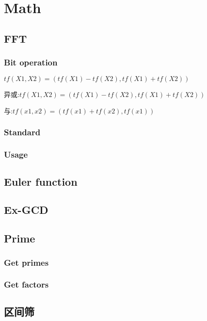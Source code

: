 \section{Math}
\subsection{FFT}
\subsubsection{Bit operation}
$tf(X1,X2) = (tf(X1) - tf(X2), tf(X1) + tf(X2))$

异或:$tf(X1,X2) = (tf(X1) - tf(X2), tf(X1) + tf(X2))$ 

与:$tf(x1,x2)=(tf(x1) + tf(x2), tf(x1))$

\subsubsection{Standard}

\subsubsection{Usage}


\subsection{Euler function}


\subsection{Ex-GCD}


\subsection{Prime}
\subsubsection{Get primes}

\subsubsection{Get factors}

\subsection{区间筛}

